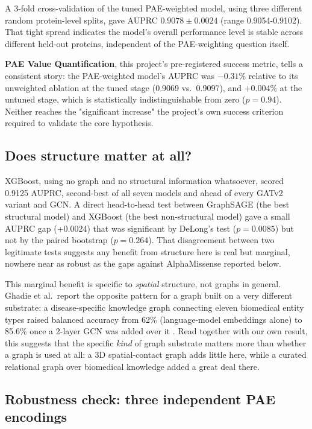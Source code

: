 \documentclass[10pt,conference,a4paper]{IEEEtran}
\begin{document}
A 3-fold cross-validation of the tuned PAE-weighted model, using three different random protein-level splits, gave AUPRC $0.9078 \pm 0.0024$ (range 0.9054-0.9102). That tight spread indicates the model's overall performance level is stable across different held-out proteins, independent of the PAE-weighting question itself.

\textbf{PAE Value Quantification}, this project's pre-registered success metric, tells a consistent story: the PAE-weighted model's AUPRC was \textbf{$-0.31\%$} relative to its unweighted ablation at the tuned stage (0.9069 vs.\ 0.9097), and $+0.004\%$ at the untuned stage, which is statistically indistinguishable from zero ($p=0.94$). Neither reaches the "significant increase" the project's own success criterion required to validate the core hypothesis.

\subsection{Does structure matter at all?}

XGBoost, using no graph and no structural information whatsoever, scored 0.9125 AUPRC, second-best of all seven models and ahead of every GATv2 variant and GCN. A direct head-to-head test between GraphSAGE (the best structural model) and XGBoost (the best non-structural model) gave a small AUPRC gap (+0.0024) that was significant by DeLong's test ($p=0.0085$) but not by the paired bootstrap ($p=0.264$). That disagreement between two legitimate tests suggests any benefit from structure here is real but marginal, nowhere near as robust as the gaps against AlphaMissense reported below.

This marginal benefit is specific to \textit{spatial} structure, not graphs in general. Ghadie et al.\ report the opposite pattern for a graph built on a very different substrate: a disease-specific knowledge graph connecting eleven biomedical entity types raised balanced accuracy from 62\% (language-model embeddings alone) to 85.6\% once a 2-layer GCN was added over it \cite{ghadie2025diseasespecific}. Read together with our own result, this suggests that the specific \textit{kind} of graph substrate matters more than whether a graph is used at all: a 3D spatial-contact graph adds little here, while a curated relational graph over biomedical knowledge added a great deal there.

\subsection{Robustness check: three independent PAE encodings}
\end{document}
